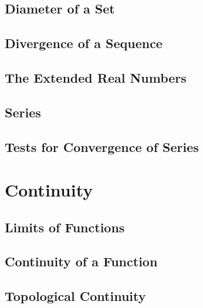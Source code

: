 \documentclass[a4paper, openany]{book}
\begin{document}
\section{Diameter of a Set}

\newpage

\section{Divergence of a Sequence}

\newpage

\section{The Extended Real Numbers}

\newpage

\section{Series}

\newpage

\section{Tests for Convergence of Series}

\newpage

\chapter{Continuity}
\section{Limits of Functions}

\newpage

\section{Continuity of a Function}

\newpage

\section{Topological Continuity}

\newpage
\end{document}
